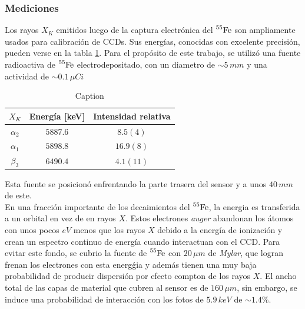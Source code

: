 \subsubsection{Mediciones}
Los rayos $X_{K}$ emitidos luego de la captura electrónica del $\prescript{55}{}{\mbox{Fe}}$ son ampliamente usados para calibración de CCDs. Sus energías, conocidas con excelente precisión, pueden verse en la tabla \ref{tab:EnergiasXk}. Para el propósito de este trabajo, se utilizó una fuente radioactiva de $\prescript{55}{}{\mbox{Fe}}$ electrodepositado, con un diametro de $\sim 5\,\si{mm}$ y una actividad de $\sim 0.1\,\si{\mu Ci}$
\begin{table}[h]
\centering
\begin{tabular}{@{}ccc@{}}
\toprule
$X_{K}$      & Energía [keV] & Intensidad relativa \\ \hline \hline
$\alpha_{2}$ & $5887.6$      & $8.5 (4)$           \\
$\alpha_{1}$   & $5898.8$      & $16.9 (8)$          \\
$\beta_{3}$  & $6490.4$      & $4.1 (11)$          \\ \bottomrule
\end{tabular}
\caption{\footnotesize{Caption}}
\label{tab:EnergiasXk}
\end{table}
Esta fuente se posicionó enfrentando la parte trasera del sensor y a unos $40\,\si{mm}$ de este.\\
\indent En una fracción importante de los decaimientos del $\prescript{55}{}{\mbox{Fe}}$, la energia es transferida a un orbital en vez de en rayos $X$. Estos electrones \textit{auger} abandonan los átomos con unos pocos $\si{eV}$ menos que los rayos $X$ debido a la energía de ionización y crean un espectro continuo de energía cuando interactuan con el CCD. Para evitar este fondo, se cubrio la fuente de $\prescript{55}{}{\mbox{Fe}}$ con $20\,\si{\mu m}$ de \textit{Mylar}, que logran frenan los electrones con esta energǵia y además tienen una muy baja probabilidad de producir dispersión por efecto compton de los rayos $X$. El ancho total de las capas de material que cubren al sensor es de $160\,\si{\mu m}$, sin embargo, se induce una probabilidad de interacción con los fotos de $5.9\,\si{keV}$ de $\sim 1.4 \%$.\\
